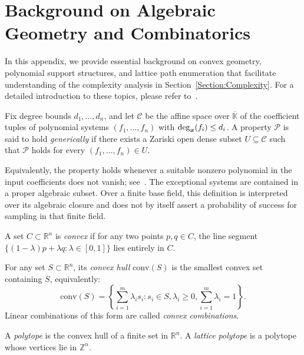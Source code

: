 \newpage
\section{Background on Algebraic Geometry and Combinatorics}\label{Appendix:A}

In this appendix, we provide essential background on convex geometry, polynomial support structures, and lattice path enumeration that facilitate understanding of the complexity analysis in Section~\ref{Section:Complexity}. For a detailed introduction to these topics, please refer to~\cite{cox2005using,sturmfels2002solving,bona2015handbook}.


\begin{definition}\label{def:generic}
	Fix degree bounds $d_1,\ldots,d_n$, and let $\mathcal{C}$ be the affine space over
	$\overline{\mathbb{K}}$ of the coefficient tuples of polynomial systems
	$(f_1,\ldots,f_n)$ with $\deg_{{\boldsymbol{x}}}(f_i)\le d_i$.
	A property $\mathcal{P}$ is said to hold \emph{generically} if there exists a
	Zariski open dense subset $U\subseteq \mathcal{C}$ such that $\mathcal{P}$ holds
	for every $(f_1,\ldots,f_n)\in U$.
\end{definition}


Equivalently, the property holds whenever a suitable nonzero polynomial in the input coefficients does not vanish; see~\cite[Chapter~3, \S5, Definition~(5.6), p.~115]{cox2005using}. The exceptional systems are contained in a proper algebraic subset. Over a finite base field, this definition is interpreted over its algebraic closure and does not by itself assert a probability of success for sampling in that finite field.


\begin{definition}
	A set $C \subset \mathbb{R}^n$ is \emph{convex} if for any two points $p, q \in C$, the line segment $\{(1-\lambda)p + \lambda q : \lambda \in [0,1]\}$ lies entirely in $C$. 
	
	For any set $S \subset \mathbb{R}^n$, its \emph{convex hull} $\text{conv}(S)$ is the smallest convex set containing $S$, equivalently:
	\[\text{conv}(S) = \left\{\sum_{i=1}^m \lambda_i s_i : s_i \in S, \lambda_i \geq 0, \sum_{i=1}^m \lambda_i = 1\right\}.\]
	Linear combinations of this form are called \emph{convex combinations}.
\end{definition}

\begin{definition}[Polytope]
	A \emph{polytope} is the convex hull of a finite set in $\mathbb{R}^n$. A \emph{lattice polytope} is a polytope whose vertices lie in $\mathbb{Z}^n$.
\end{definition}


